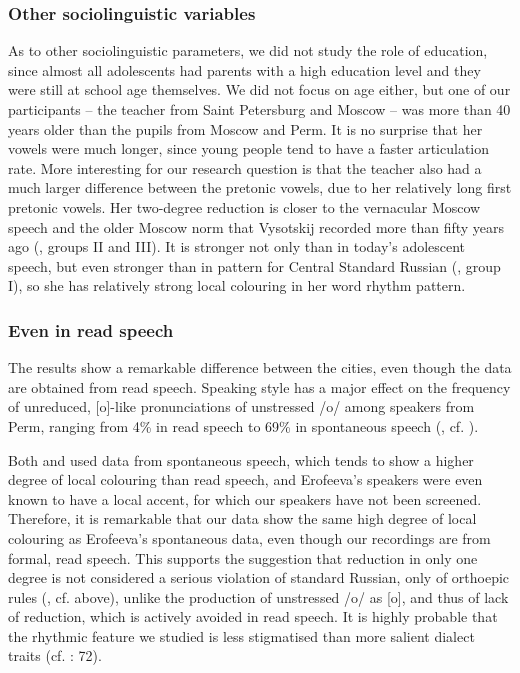 \documentclass[output=paper]{langscibook}
\begin{document}
\subsubsection{Other sociolinguistic variables}
\label{sec:post:4.4.2}
As to other sociolinguistic parameters, we did not study the role of education, since almost all adolescents had parents with a high education level and they were still at school age themselves. We did not focus on age either, but one of our participants – the teacher from Saint Petersburg and Moscow – was more than 40 years older than the pupils from Moscow and Perm. It is no surprise that her vowels were much longer, since young people tend to have a faster articulation rate. More interesting for our research question is that the teacher also had a much larger difference between the pretonic vowels, due to her relatively long first pretonic vowels. Her two-degree reduction is closer to the vernacular Moscow speech and the older Moscow norm that Vysotskij recorded more than fifty years ago (, groups II and III). It is stronger not only than in today’s adolescent speech, but even stronger than in  pattern for Central Standard Russian (, group I), so she has relatively strong local colouring in her word rhythm pattern.


\subsubsection{Even in read speech}
\label{sec:post:4.4.3}
The results show a remarkable difference between the cities, even though the data are obtained from read speech. Speaking style has a major effect on the frequency of unreduced, [o]-like pronunciations of unstressed \mbox{/o/} among speakers from Perm, ranging from 4\% in read speech to 69\% in spontaneous speech (\citealt{VerbickajaEtAl1984, Erofeeva1993}, cf. ). 



Both \citet{Vysotskij1973} and \citet{Erofeeva2005} used data from spontaneous speech, which tends to show a higher degree of local colouring than read speech, and Erofeeva’s speakers were even known to have a local accent, for which our speakers have not been screened. Therefore, it is remarkable that our data show the same high degree of local colouring as Erofeeva’s spontaneous data, even though our recordings are from formal, read speech. This supports the suggestion that reduction in only one degree is not considered a serious violation of standard Russian, only of orthoepic rules (\citealt{Bondarko1998}, cf.  above), unlike the production of unstressed \mbox{/o/} as [o], and thus of lack of reduction, which is actively avoided in read speech. It is highly probable that the rhythmic feature we studied is less stigmatised than more salient dialect traits (cf. \citealt{GrammatčikovaPožarickaja2013}: 72). 
\end{document}
